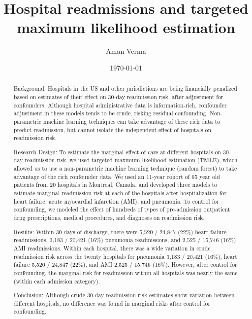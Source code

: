 \documentclass[]{article}\usepackage[]{graphicx}\usepackage[]{color}
\begin{document}
\title{Hospital readmissions and targeted maximum likelihood estimation}
\author{Aman Verma}
\date{\today}

\begin{abstract}






Background: Hospitals in the US and other jurisdictions are being financially penalized based on estimates of their effect on 30-day readmission risk, after adjustment for confounders. Although hospital administrative data is information-rich, confounder adjustment in these models tends to be crude, risking residual confounding. Non-parametric machine learning techniques can take advantage of these rich data to predict readmission, but cannot isolate the independent effect of hospitals on readmission risk.

Research Design: To estimate the marginal effect of care at different hospitals on 30-day readmission risk, we used targeted maximum likelihood estimation (TMLE), which allowed us to use a non-parametric machine learning technique (random forest) to take advantage of the rich confounder data. We used an 11-year cohort of 65 year old patients from 20 hospitals in Montreal, Canada, and developed three models to estimate marginal readmission risk at each of the hospitals after hospitalization for heart failure, acute myocardial infarction (AMI), and pneumonia. To control for confounding, we modeled the effect of hundreds of types of pre-admission outpatient drug prescriptions, medical procedures, and diagnoses on readmission risk.

Results: Within 30 days of discharge, there were 5,520 / 24,847 (22\%) heart failure readmissions, 3,183 / 20,421 (16\%) pneumonia readmissions, and 2,525 / 15,746 (16\%) AMI readmissions. Within each hospital, there was a wide variation in crude readmission risk across the twenty hospitals for pneumonia 3,183 / 20,421 (16\%), heart failure 5,520 / 24,847 (22\%), and AMI 2,525 / 15,746 (16\%). However, after control for confounding, the marginal risk for readmission within all hospitals was nearly the same (within each admission category).

Conclusion: Although crude 30-day readmission risk estimates show variation between different hospitals, no difference was found in marginal risks after control for confounding.

\end{abstract}
\end{document}
